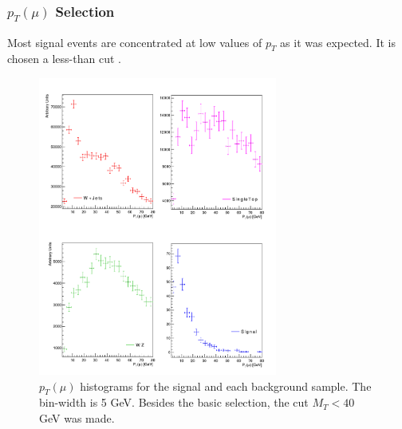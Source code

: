 \documentclass{beamer}
\begin{document}
\begin{frame}
\frametitle{$p_T(\mu)$ Selection}

\begin{justify}
{\scriptsize Most signal events are concentrated at low values of $p_T$ as it was expected. It is chosen a less-than cut .}
\end{justify}

\begin{figure}[!h]

\centering
\includegraphics[width=0.7\textwidth, height=0.6\textheight]{pictures/Selection/P_TMu/All-P_TMu}
\caption{{\scriptsize $p_T(\mu)$ histograms for the signal and each background sample. The bin-width is 5 GeV. Besides the basic selection, the cut $M_T<40$ GeV was made.}}
\label{P_TMu}

\end{figure}


\end{frame}

\end{document}
